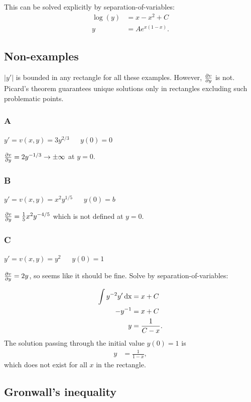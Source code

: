 This can be solved explicitly by separation-of-variables:
\begin{align*}
  \log(y) &= x- x^2 + C\\
  y       &= Ae^{x(1-x)}.
\end{align*}


\subsection{Non-examples}

$|y'|$ is bounded in any rectangle for all these examples. However,
$\frac{\partial v}{\partial y}$ is not. Picard's theorem guarantees unique solutions only in
rectangles excluding such problematic points.

\subsubsection{A}
$y' = v(x, y) = 3y^{2/3}  ~~~~~~~ y(0) = 0$

$\frac{\partial v}{\partial y} = 2y^{-1/3} \to \pm \infty$ at $y=0$.


\subsubsection{B}
$y' = v(x, y) = x^2y^{1/5} ~~~~~~~ y(0) = b$

$\frac{\partial v}{\partial y} = \frac{1}{5}x^2y^{-4/5}$ which is not defined at $y=0$.

\subsubsection{C}
$y' = v(x, y) = y^2       ~~~~~~~ y(0) = 1$

$\frac{\partial v}{\partial y} = 2y$, so seems like it should be fine. Solve by
separation-of-variables:

\begin{align*}
  \int y^{-2} y' \operatorname{\text{dx}} &= x + C\\
  -y^{-1}            &= x + C\\
  y                 &= \frac{1}{C - x}.
\end{align*}
The solution passing through the initial value $y(0) = 1$ is
\begin{align*}
  y                  &= \frac{1}{1 - x},
\end{align*}
which does not exist for all $x$ in the rectangle.

\newpage

\subsection{Gronwall's inequality}

